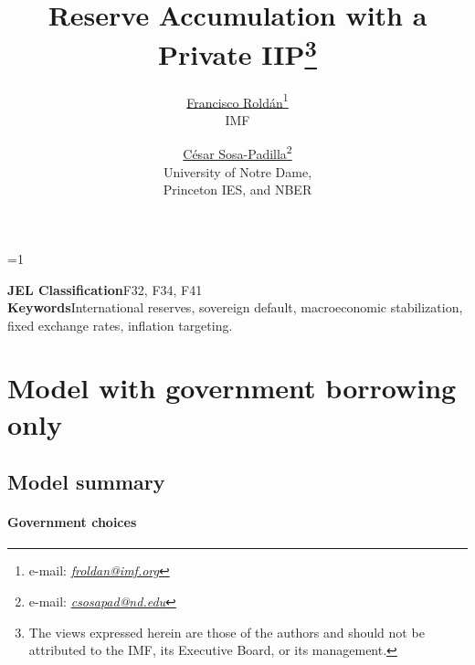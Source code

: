 
\linespread{1.32} %

\def\acknowledgements{}

\title{Reserve Accumulation with a Private IIP\thanks{The views expressed herein are those of the authors and should not be attributed to the IMF, its Executive Board, or its management. \acknowledgements}}

\author{\href{https://fqroldan.github.io}{Francisco Rold\'{a}n}\thanks{e-mail: \href{mailto:froldan@imf.org}{\emph{froldan@imf.org}}}\\IMF \and \href{https://sosapadilla.github.io}{C\'{e}sar Sosa-Padilla}\thanks{e-mail: \href{mailto:csosapad@nd.edu}{\emph{csosapad@nd.edu}}} \\University of Notre Dame,\\ Princeton IES, and NBER}

\ifdefined\ungated
\else
\def\ungated{1}
\fi

\date{\monthname\xspace \the\year %
}


\ifnum\ungated=1%
	\maketitle 
	\begin{abstract}
		\noindent
	\end{abstract}
	\vfill
	\noindent\textbf{JEL Classification}\quad F32, F34, F41\\
	\noindent\textbf{Keywords}\quad International reserves, sovereign default, macroeconomic stabilization, fixed exchange rates, inflation targeting.
	\bigskip
	\vfill
\else
	
	\tableofcontents
\fi
\pagebreak 


\section{Model with government borrowing only}
\subsection{Model summary}
\paragraph{Government choices}

